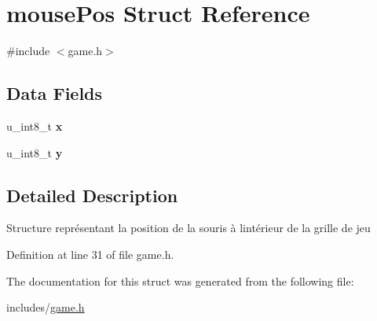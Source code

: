 \hypertarget{structmouse_pos}{}\section{mouse\+Pos Struct Reference}
\label{structmouse_pos}


{\ttfamily \#include $<$game.\+h$>$}

\subsection*{Data Fields}
\begin{DoxyCompactItemize}
\item 
\mbox{\label{structmouse_pos_a121a1c4a169f06c39e7d987484676ca1}} 
u\+\_\+int8\+\_\+t {\bfseries x}
\item 
\mbox{\label{structmouse_pos_ab1f68b8e03b9be58dc27625ca64d3687}} 
u\+\_\+int8\+\_\+t {\bfseries y}
\end{DoxyCompactItemize}


\subsection{Detailed Description}
Structure représentant la position de la souris à l\textquotesingle{}intérieur de la grille de jeu 

Definition at line 31 of file game.\+h.



The documentation for this struct was generated from the following file\+:\begin{DoxyCompactItemize}
\item 
includes/\hyperlink{game_8h}{game.\+h}\end{DoxyCompactItemize}
